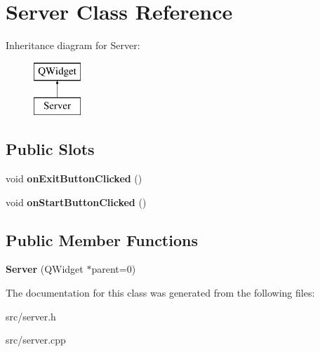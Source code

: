\hypertarget{class_server}{}\section{Server Class Reference}
\label{class_server}
Inheritance diagram for Server\+:\begin{figure}[H]
\begin{center}
\leavevmode
\includegraphics[height=2.000000cm]{class_server}
\end{center}
\end{figure}
\subsection*{Public Slots}
\begin{DoxyCompactItemize}
\item 
\hypertarget{class_server_a99f9b2f3521fb22772a61baf4f3c7bdc}{}\label{class_server_a99f9b2f3521fb22772a61baf4f3c7bdc} 
void {\bfseries on\+Exit\+Button\+Clicked} ()
\item 
\hypertarget{class_server_abe8ac23afc4d282f89ec9fac8e7bf7f3}{}\label{class_server_abe8ac23afc4d282f89ec9fac8e7bf7f3} 
void {\bfseries on\+Start\+Button\+Clicked} ()
\end{DoxyCompactItemize}
\subsection*{Public Member Functions}
\begin{DoxyCompactItemize}
\item 
\hypertarget{class_server_a0bf03b27b29ae4b969ec903f95041a17}{}\label{class_server_a0bf03b27b29ae4b969ec903f95041a17} 
{\bfseries Server} (Q\+Widget $\ast$parent=0)
\end{DoxyCompactItemize}


The documentation for this class was generated from the following files\+:\begin{DoxyCompactItemize}
\item 
src/server.\+h\item 
src/server.\+cpp\end{DoxyCompactItemize}
